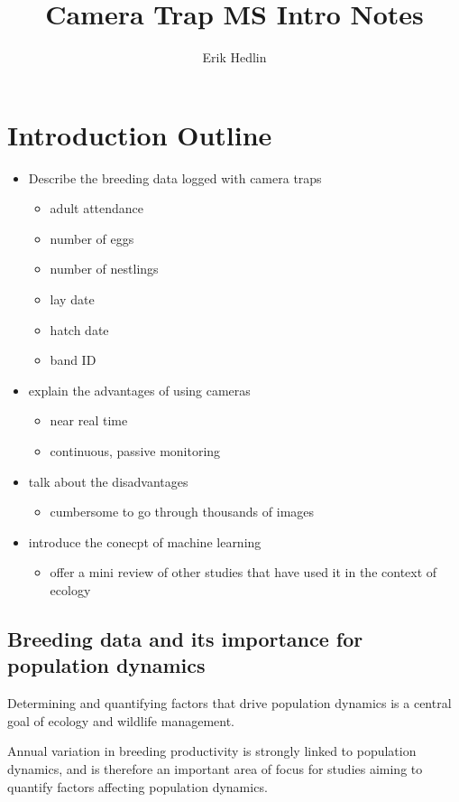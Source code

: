\documentclass[]{scrartcl}
\title{Camera Trap MS Intro Notes}
\author{Erik Hedlin}
\begin{document}
\maketitle

\section*{Introduction Outline}
\begin{itemize}
	\item Describe the breeding data logged with camera traps
	\begin{itemize}
		\item adult attendance
		\item number of eggs
		\item number of nestlings
		\item lay date
		\item hatch date
		\item band ID
	\end{itemize}
	\item explain the advantages of using cameras
	\begin{itemize}
		\item near real time
		\item continuous, passive monitoring
	\end{itemize}
	\item talk about the disadvantages
	\begin{itemize}
		\item cumbersome to go through thousands of images
	\end{itemize}
	\item introduce the conecpt of machine learning
	\begin{itemize}
		\item offer a mini review of other studies that have used it in the context of ecology
	\end{itemize}
\end{itemize}

\newpage

\subsection*{Breeding data and its importance for population dynamics}
Determining and quantifying factors that drive population dynamics is a central goal of ecology and wildlife management. 

Annual variation in breeding productivity is strongly linked to population dynamics, and is therefore an important area of focus for studies aiming to 
quantify factors affecting population dynamics.
\end{document}
